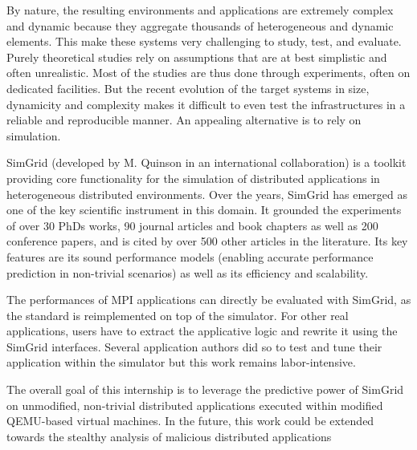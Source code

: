 \documentclass[a4paper,11pt]{article}
\begin{document}
By nature, the resulting environments and applications are extremely
complex and dynamic because they aggregate thousands of heterogeneous
and dynamic elements. This make these systems very challenging to
study, test, and evaluate.  Purely theoretical studies rely on
assumptions that are at best simplistic and often unrealistic. Most of
the studies are thus done through experiments, often on dedicated
facilities.
%
But the recent evolution of the target systems in size, dynamicity and
complexity makes it difficult to even test the infrastructures in a
reliable and reproducible manner. An appealing alternative is to rely
on simulation.


SimGrid (developed by M. Quinson in an international collaboration) is
a toolkit providing core functionality for the simulation of
distributed applications in heterogeneous distributed environments.
Over the years, SimGrid has emerged as one of the key scientific
instrument in this domain. It grounded the experiments of over 30 PhDs
works, 90 journal articles and book chapters as well as 200 conference
papers, and is cited by over 500 other articles in the literature. Its
key features are its sound performance models (enabling accurate
performance prediction in non-trivial scenarios) as well as its
efficiency and scalability.

The performances of MPI applications can directly be evaluated with
SimGrid, as the standard is reimplemented on top of the simulator. For
other real applications, users have to extract the applicative logic
and rewrite it using the SimGrid interfaces. Several application
authors did so to test and tune their application within the simulator
but this work remains labor-intensive. %

The overall goal of this internship is to leverage the predictive
power of SimGrid on unmodified, non-trivial distributed applications
executed within modified QEMU-based virtual machines. In the future,
this work could be extended towards the stealthy analysis of malicious
distributed applications

\end{document}
